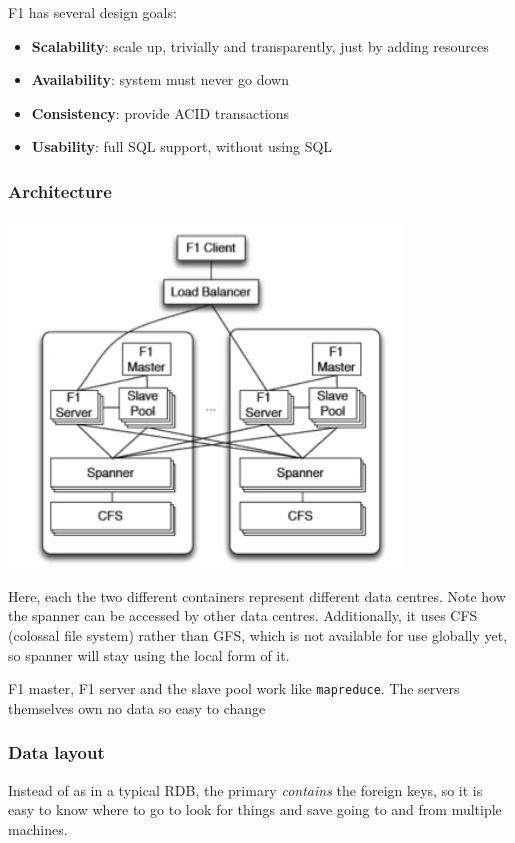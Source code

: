 \documentclass[11pt,a4paper,titlepage,dvipsnames,cmyk]{scrartcl}
\begin{document}
F1 has several design goals:
\begin{itemize}
    \item \textbf{Scalability}: scale up, trivially and transparently, just by adding resources
    \item \textbf{Availability}: system must never go down
    \item \textbf{Consistency}: provide ACID transactions
    \item \textbf{Usability}: full SQL support, without using SQL
\end{itemize}

\subsubsection{Architecture}
\begin{center}
\includegraphics{pics/f1architecture.png}
\end{center}

Here, each the two different containers represent different data centres. Note how the spanner can be accessed by other data centres. Additionally, it uses CFS (colossal file system) rather than GFS, which is not available for use globally yet, so spanner will stay using the local form of it.

F1 master, F1 server and the slave pool work like \texttt{mapreduce}. The servers themselves own no data so easy to change

\subsubsection{Data layout}
Instead of as in a typical RDB, the primary \textit{contains} the foreign keys, so it is easy to know where to go to look for things and save going to and from multiple machines.
\end{document}

